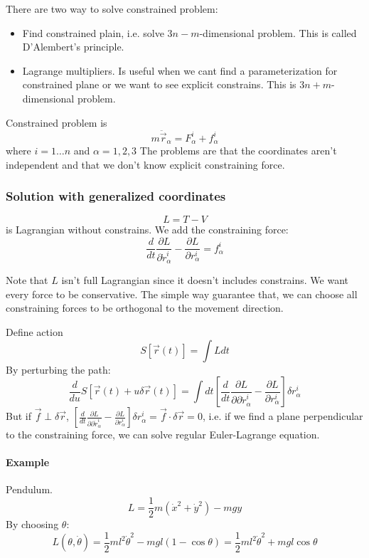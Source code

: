 There are two way to solve constrained problem:
\begin{itemize}
	\item Find constrained plain, i.e. solve $3n-m$-dimensional problem. This is called D'Alembert's principle.
	\item Lagrange multipliers. Is useful when we cant find a parameterization for constrained plane or we want to see explicit constrains. This is $3n+m$-dimensional problem.
\end{itemize}

Constrained problem is
$$m\ddot{\vec{r}}_\alpha = F^i_\alpha + f^i_\alpha$$
where $i=1\dots n$ and $\alpha = 1,2,3$
The problems are that the coordinates aren't independent and that we don't know explicit constraining force.
\subsubsection{Solution with generalized coordinates}
$$L = T - V$$
is Lagrangian without constrains.
We add the constraining force:
$$\frac{d}{dt} \frac{\partial L}{\partial  \dot{r}^i_\alpha} - \frac{\partial L}{\partial  r^i_\alpha} =  f^i_\alpha $$

Note that $L$ isn't full Lagrangian since it doesn't includes constrains. We want every force to be conservative. The simple way guarantee that, we can choose all constraining forces to be orthogonal to the movement direction.

Define action
$$S\left[ \vec{r}(t) \right] = \int L dt$$
By perturbing the path:
$$\frac{d}{du} S\left[ \vec{r}(t) + u\delta \vec{r}(t)\right] = \int dt \left[\frac{d}{dt} \frac{\partial L}{\partial \partial \dot{r}^i_\alpha} - \frac{\partial L}{\partial  r^i_\alpha}\right] \delta  r^i_\alpha$$
But if $\vec{f} \perp \delta \vec{r}$, $\left[\frac{d}{dt} \frac{\partial L}{\partial \partial \dot{r}^i_\alpha} - \frac{\partial L}{\partial  r^i_\alpha}\right] \delta  r^i_\alpha = \vec{f} \cdot \delta \vec{r}= 0$, i.e. if we find a plane perpendicular to the constraining force, we can solve regular Euler-Lagrange equation.
\paragraph{Example}
Pendulum. 
$$L = \frac{1}{2} m(\dot{x}^2+\dot{y}^2) - mgy$$
By choosing $\theta$:
$$L(\theta, \dot{\theta}) = \frac{1}{2}ml^2 \dot{\theta}^2 -mgl(1-\cos \theta) = \frac{1}{2}ml^2 \dot{\theta}^2 + mgl\cos \theta$$
